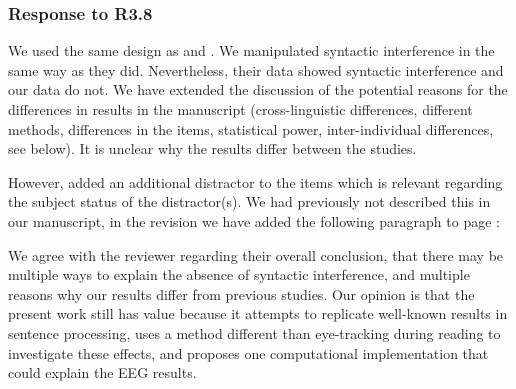\documentclass[12pt]{article}
\begin{document}
\subsubsection*{Response to R3.8}
We used the same design as \textcite{vandyke07} and \textcite{mertzen}. We manipulated syntactic interference in the same way as they did. Nevertheless, their data showed syntactic interference and our data do not. We have extended the discussion of the potential reasons for the differences in results in the manuscript (cross-linguistic differences, different methods, differences in the items, statistical power, inter-individual differences, see below). It is unclear why the results differ between the studies. 

However, \textcite{mertzen} added an additional distractor to the items which is relevant regarding the subject status of the distractor(s). We had previously not described this in our manuscript, in the revision we have added the following paragraph to page \pageref{items_mertzen}:

\setcounter{exx}{4}
\begin{quote}
\end{quote}

We agree with the reviewer regarding their overall conclusion, that there may be multiple ways to explain the absence of syntactic interference, and multiple reasons why our results differ from previous studies. Our opinion is that the present work still has value because it attempts to replicate well-known results in sentence processing, uses a method different than eye-tracking during reading to investigate these effects, and proposes one computational implementation that could explain the EEG results.
\end{document}

